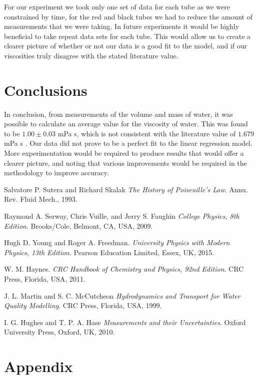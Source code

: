 \documentclass[twocolumn]{revtex4}
\begin{document}
For our experiment we took only one set of data for each tube as we were constrained by time, for the red and black tubes we had to reduce the amount of measurements that we were taking. In future experiments it would be highly beneficial to take repeat data sets for each tube. This would allow us to create a clearer picture of whether or not our data is a good fit to the model, and if our viscosities truly disagree with the stated literature value. 

\vspace{-5ex}
\section{Conclusions}
\vspace{-2ex}
In conclusion, from measurements of the volume and mass of water, it was possible to calculate an average value for the viscosity of water. This was found to be $1.00 \pm 0.03$ mPa s, which is not consistent with the literature value of $1.679$  mPa {s} \cite{crc}. Our data did not prove to be a perfect fit to the linear regression model. More experimentation would be required to produce results that would offer a clearer picture, and noting that various improvements would be required in the methodology to improve accuracy.

\begin{thebibliography}{5}
	Salvatore P. Sutera and Richard Skalak
	\textit{The History of Poiseuille's Law}.
	Annu. Rev. Fluid Mech., 1993.
	
	Raymond A. Serway, Chris Vuille, and Jerry S. Faughin
	\textit{College Physics, 8th Edition}.
	Brooks/Cole, Belmont, CA, USA, 2009.

	Hugh D. Young and Roger A. Freedman.
	\textit{University Physics with Modern Physics, 13th Edition}. 
	Pearson Education Limited, Essex, UK, 2015.
	
	W. M. Haynes.
	\textit{CRC Handbook of Chemistry and Physics, 92nd Edition}. 
	CRC Press, Florida, USA, 2011.
	
	J. L. Martin and S. C. McCutcheon
	\textit{Hydrodynamics and Transport for Water Quality Modelling}. 
	CRC Press, Florida, USA, 1999.
	
	I. G. Hughes and T. P. A. Hase
	\textit{Measurements and their Uncertainties}. 
	Oxford University Press, Oxford, UK, 2010.
	
\end{thebibliography}
\clearpage

\vfill
\twocolumngrid
\vspace{-3ex}
\section*{Appendix}
\vspace{-2ex}


\clearpage
\end{document}
